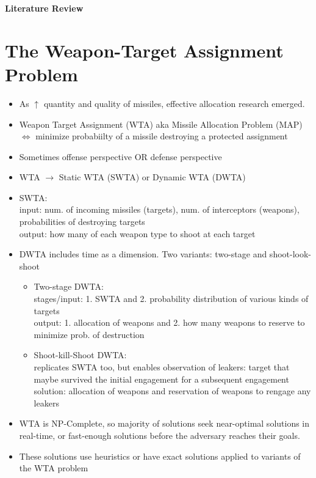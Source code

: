 \documentclass[12pt]{article} %
\begin{document}
 
\begin{center}
\textbf{Literature Review}
\end{center}
\bigskip

\section*{The Weapon-Target Assignment Problem \\ \cite{wtap_kline_2019}}

\begin{itemize}
    \item As $\uparrow$ quantity and quality of missiles, effective allocation research emerged.
    \item Weapon Target Assignment (WTA) aka Missile Allocation Problem (MAP) $\Leftrightarrow$ minimize probabiilty of a missile destroying a protected assignment
    \item Sometimes offense perspective OR defense perspective 
    \item WTA $\rightarrow$ Static WTA (SWTA) or Dynamic WTA (DWTA)
    \item SWTA:
    \\ input: num. of incoming missiles (targets), num. of interceptors (weapons), probabilities of destroying targets
    \\ output: how many of each weapon type to shoot at each target

    \item DWTA includes time as a dimension. Two variants: two-stage and shoot-look-shoot

    \begin{itemize}
        \item Two-stage DWTA: 
        \\ stages/input: 1. SWTA and 2. probability distribution of various kinds of targets 
        \\ output: 1. allocation of weapons and 2. how many weapons to reserve to minimize prob. of destruction
        
        \item Shoot-kill-Shoot DWTA:
        \\ replicates SWTA too, but enables observation of leakers: target that maybe survived the initial engagement for a subsequent engagement
        \\ solution: allocation of weapons and reservation of weapons to rengage any leakers
    \end{itemize}

    \item WTA is NP-Complete, so majority of solutions seek near-optimal solutions in real-time, or fast-enough solutions before the adversary reaches their goals.
    \item These solutions use heuristics or have exact solutions applied to variants of the WTA problem

\end{itemize}
\end{document}
